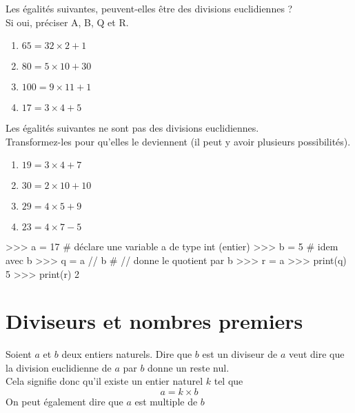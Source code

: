 \documentclass[a4paper,12pt,french]{book}
\begin{document}
\begin{exercice}[]
	Les égalités suivantes, peuvent-elles être des divisions euclidiennes ?\\
	Si oui, préciser A, B, Q et R.
	\begin{multicols}{4}
		\begin{enumerate}[\bfseries a.]
			\item 	$65=32\times 2 +1$
			\item 	$80=5\times 10 + 30$
			\item 	$100 = 9\times 11 +1$
			\item 	$17=    3\times4 +5	$\\
		\end{enumerate}
	\end{multicols}
\end{exercice}

\begin{exercice}[]
	
	Les égalités suivantes ne sont pas des divisions euclidiennes.\\
	Transformez-les pour qu'elles le deviennent (il peut y avoir plusieurs possibilités).
	
	\begin{multicols}{4}
		\begin{enumerate}[\bfseries a.]
			\item 	$19=3\times 4 + 7$
			\item 	$30=2\times 10 + 10$
			\item 	$29 = 4\times 5 +9$
			\item 	$23=  4\times 7 -5$\\
		\end{enumerate}
	\end{multicols}
\end{exercice}



\begin{pythoncode}
>>> a = 17   # déclare une variable a de type int (entier)
>>> b = 5    # idem avec b
>>> q = a // b # // donne le quotient par b
>>> r = a %
>>> print(q)
5
>>> print(r)
2
\end{pythoncode}
\section{Diviseurs et nombres premiers}

\begin{propriete}
Soient $a$ et $b$ deux entiers naturels. Dire que $b$ est un diviseur de $a$ veut dire que la division euclidienne de $a$ par $b$ donne un reste nul.\\
Cela signifie donc qu'il existe un entier naturel $k$ tel que $$a=k\times b$$
On peut également dire que $a$ est multiple de $b$
\end{propriete}
\end{document}
